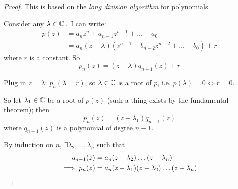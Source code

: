 \documentclass[twoside]{scrartcl}
\begin{document}
\begin{proof}
	This is based on the \emph{long division algorithm} for polynomials. 
	
	Consider any $\lambda \in\mathbb{C}:$ I can write: 
	\[
\begin{aligned}
  p(z) &= a_nz^n + a_{n-1}z^{n-1} + \dots + a_0\\
  &= a_n (z-\lambda)(z^{n-1} + b_{n-2}z^{n-2} + \dots + b_0) + r
\end{aligned}
\]
where $r$ is a constant. So 
\[p_n(z) = (z-\lambda)q_{n-1}(z) + r\]

Plug in $z = \lambda$: $p_n(\lambda = r)$, so $\lambda \in\mathbb{C}$ is a root of $p$, i.e. $p(\lambda)  = 0 \iff r = 0$. 

So let $\lambda_1 \in\mathbb{C}$ be a root of $p(z)$ (such a thing exists by the fundamental theorem); then 
\[p_n(z) = (z-\lambda_1)q_{n-1}(z)\]
where $q_{n-1}(z)$ is a polynomial of degree $n-1$. 

By induction on $n$, $\exists \lambda_2,\dots,\lambda_n$ such that 
\[
\begin{aligned}
  q_{n-1}(z) &= a_n(z-\lambda_2)\dots(z-\lambda_n)\\
  \implies p_n(z) &= a_n(z-\lambda_1)(z-\lambda_2)\dots(z-\lambda_n)\qedhere
\end{aligned}
\]
\end{proof}\vspace*{10pt}
\end{document}
